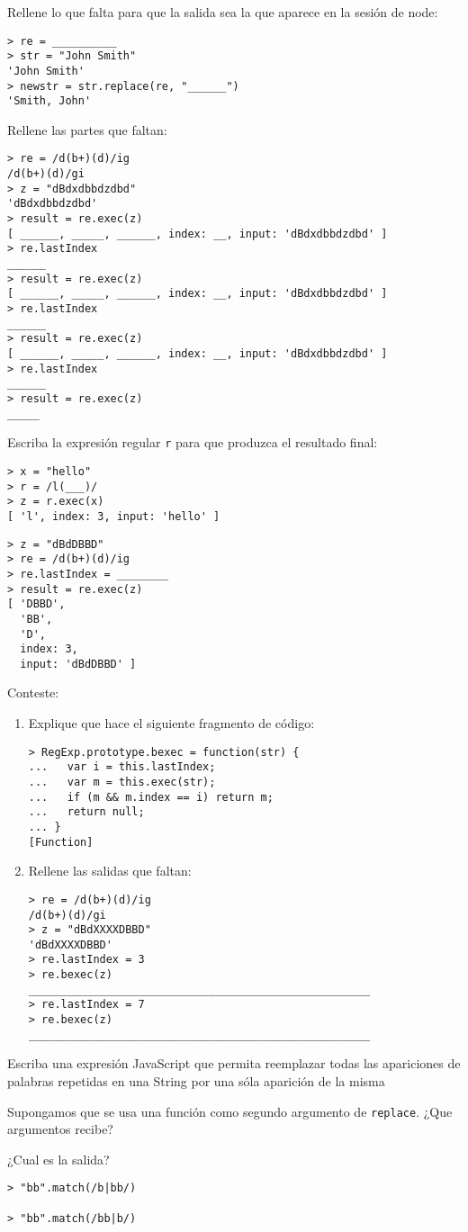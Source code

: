 \item Rellene lo que falta para que la salida sea la que aparece en la sesión de node:
\begin{verbatim}
> re = __________
> str = "John Smith"
'John Smith'
> newstr = str.replace(re, "______")
'Smith, John'
\end{verbatim}
\item  Rellene las partes que faltan:
\begin{verbatim}
> re = /d(b+)(d)/ig
/d(b+)(d)/gi
> z = "dBdxdbbdzdbd"
'dBdxdbbdzdbd'
> result = re.exec(z)
[ ______, _____, ______, index: __, input: 'dBdxdbbdzdbd' ]
> re.lastIndex
______
> result = re.exec(z)
[ ______, _____, ______, index: __, input: 'dBdxdbbdzdbd' ]
> re.lastIndex
______
> result = re.exec(z)
[ ______, _____, ______, index: __, input: 'dBdxdbbdzdbd' ]
> re.lastIndex
______
> result = re.exec(z)
_____
\end{verbatim}
\item Escriba la expresión regular \verb|r| para que produzca el resultado final:
\begin{verbatim}
> x = "hello"
> r = /l(___)/
> z = r.exec(x)
[ 'l', index: 3, input: 'hello' ]
\end{verbatim}
\item 
\begin{verbatim}
> z = "dBdDBBD"
> re = /d(b+)(d)/ig
> re.lastIndex = ________
> result = re.exec(z)
[ 'DBBD',
  'BB',
  'D',
  index: 3,
  input: 'dBdDBBD' ]
\end{verbatim}
\item  Conteste:
\begin{enumerate}
\item Explique que hace el siguiente fragmento de código:
\begin{verbatim}
> RegExp.prototype.bexec = function(str) {
...   var i = this.lastIndex;
...   var m = this.exec(str);
...   if (m && m.index == i) return m;
...   return null;
... }
[Function]
\end{verbatim}
\item Rellene las salidas que faltan:
\begin{verbatim}
> re = /d(b+)(d)/ig
/d(b+)(d)/gi
> z = "dBdXXXXDBBD"
'dBdXXXXDBBD'
> re.lastIndex = 3
> re.bexec(z)
_____________________________________________________
> re.lastIndex = 7
> re.bexec(z)
_____________________________________________________
\end{verbatim}
\end{enumerate}
\item 
Escriba una expresión JavaScript que permita reemplazar todas las apariciones de palabras repetidas en una String por una sóla aparición de la misma
\item 
Supongamos que se usa una función como segundo argumento de \verb|replace|.
¿Que argumentos recibe?
\item 
¿Cual es la salida?
\begin{verbatim}
> "bb".match(/b|bb/)

> "bb".match(/bb|b/)

\end{verbatim}

